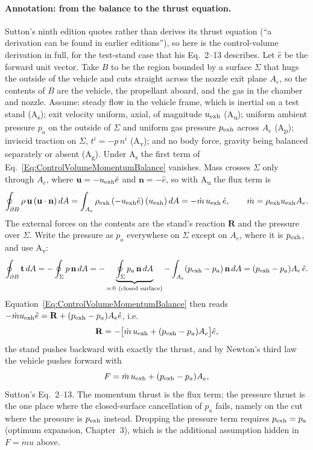 \paragraph*{Annotation: from the balance to the thrust equation.}
Sutton's ninth edition quotes rather than derives its thrust equation
(``a derivation can be found in earlier editions''), so here is the
control-volume derivation in full, for the test-stand case that his Eq.~2--13
describes. Let $\hat e$ be the forward unit vector. Take $B$ to be the region
bounded by a surface $\Sigma$ that hugs the outside of the vehicle and cuts
straight across the nozzle exit plane $A_e$, so the contents of $B$ are the
vehicle, the propellant aboard, and the gas in the chamber and nozzle. Assume:
steady flow in the vehicle frame, which is inertial on a test stand
(A\textsubscript{s}); exit velocity uniform, axial, of magnitude $u_{\rm exh}$
(A\textsubscript{u}); uniform ambient pressure $p_a$ on the outside of
$\Sigma$ and uniform gas pressure $p_{\rm exh}$ across $A_e$ (A\textsubscript{p});
inviscid traction on $\Sigma$, $t^i=-p\,n^i$ (A\textsubscript{v}); and no body
force, gravity being balanced separately or absent (A\textsubscript{g}). Under
A\textsubscript{s} the first term of
Eq.~\ref{Eq:ControlVolumeMomentumBalance} vanishes. Mass crosses $\Sigma$ only
through $A_e$, where $\mathbf u=-u_{\rm exh}\hat e$ and $\mathbf n=-\hat e$, so with
A\textsubscript{u} the flux term is
\[
 \oint_{\partial B}\rho\,\mathbf u\,(\mathbf u\cdot\mathbf n)\,dA
 =\int_{A_e}\rho_{\rm exh}\,(-u_{\rm exh}\hat e)\,(u_{\rm exh})\,dA
 =-\dot m\,u_{\rm exh}\,\hat e,
 \qquad \dot m=\rho_{\rm exh}u_{\rm exh}A_e .
\]
The external forces on the contents are the stand's reaction $\mathbf R$ and
the pressure over $\Sigma$. Write the pressure as $p_a$ everywhere on $\Sigma$
except on $A_e$, where it is $p_{\rm exh}$, and use A\textsubscript{v}:
\[
 \oint_{\partial B}\mathbf t\,dA
 =-\oint_{\Sigma}p\,\mathbf n\,dA
 =-\underbrace{\oint_{\Sigma}p_a\,\mathbf n\,dA}_{=\,0\ \text{(closed surface)}}
  -\int_{A_e}(p_{\rm exh}-p_a)\,\mathbf n\,dA
 =(p_{\rm exh}-p_a)A_e\,\hat e .
\]
Equation~\ref{Eq:ControlVolumeMomentumBalance} then reads
$-\dot m u_{\rm exh}\hat e=\mathbf R+(p_{\rm exh}-p_a)A_e\hat e$, i.e.
\[
 \mathbf R=-\bigl[\dot m\,u_{\rm exh}+(p_{\rm exh}-p_a)A_e\bigr]\hat e ,
\]
the stand pushes backward with exactly the thrust, and by Newton's third law
the vehicle pushes forward with
\begin{equation}\label{Eq:ThrustEquation}
 F=\dot m\,u_{\rm exh}+(p_{\rm exh}-p_a)A_e ,
\end{equation}
Sutton's Eq.~2--13. The momentum thrust is the flux term; the pressure thrust
is the one place where the closed-surface cancellation of $p_a$ fails, namely
on the cut where the pressure is $p_{\rm exh}$ instead. Dropping the pressure
term requires $p_{\rm exh}=p_a$ (optimum expansion, Chapter~3), which is the
additional assumption hidden in $F=\dot m u$ above.

